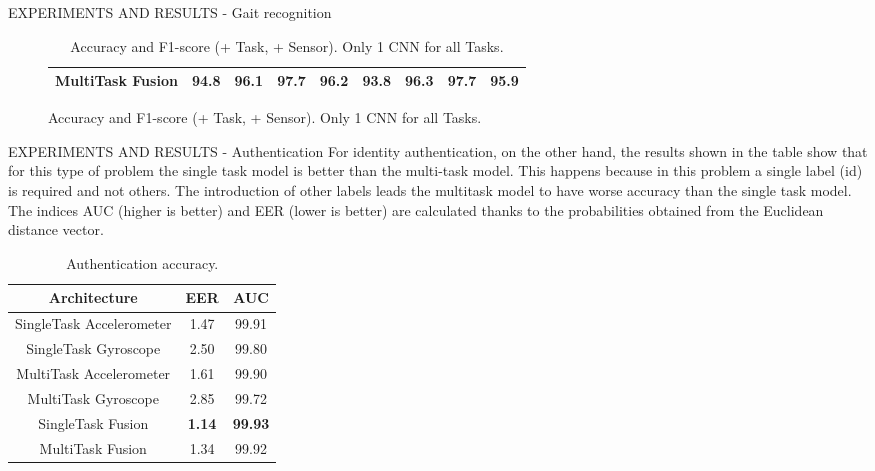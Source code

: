\begin{frame}{EXPERIMENTS AND RESULTS - Gait recognition}
\begin{minipage}{\linewidth}
\begin{minipage}{0.45\linewidth}
\begin{figure}[htbp]
\begin{table}[h!]
\begin{adjustbox}{max width=\textwidth}
\begin{tabular}{|c||ccc|c||ccc|c|}
                        \hline
                            MultiTask Fusion & \bfseries{94.8} & \bfseries{96.1} & \bfseries{97.7} & \bfseries{96.2} & \bfseries{93.8} & \bfseries{96.3} & \bfseries{97.7} & \bfseries{95.9}\\
                        \hline 
                    \end{tabular}
                    \end{adjustbox}
                    \caption{Accuracy and F1-score (+ Task, + Sensor). Only 1 CNN for all Tasks.}
                    \label{table accuracy and F1 (+ Task, + Sensor)}
                \end{table}
            \end{figure}
        \end{minipage}
    \end{minipage}
\end{frame}

\begin{frame}{EXPERIMENTS AND RESULTS - Authentication}
    For identity authentication, on the other hand, the results shown in the table show that for this type of problem the single task model is better than the multi-task model. This happens because in this problem a single label (id) is required and not others. The introduction of other labels leads the multitask model to have worse accuracy than the single task model. The indices AUC (higher is better) and EER (lower is better) are calculated thanks to the probabilities obtained from the Euclidean distance vector.
    \begin{table}[h!]
        \centering
        \begin{adjustbox}{max width=\textwidth}
        \begin{tabular}{|c|cc|}
            \hline
            Architecture & EER & AUC\\
            \hline
            SingleTask Accelerometer & 1.47 & 99.91\\
            SingleTask Gyroscope & 2.50 & 99.80\\
            \hline
            MultiTask Accelerometer & 1.61 & 99.90\\
            MultiTask Gyroscope & 2.85 & 99.72\\
            \hline
            SingleTask Fusion & \bfseries{1.14} & \bfseries{99.93}\\
            \hline
            MultiTask Fusion & 1.34 & 99.92\\
            \hline
        \end{tabular}
        \end{adjustbox}
        \caption{Authentication accuracy.}
        \label{Authentication}
    \end{table}
\end{frame}

